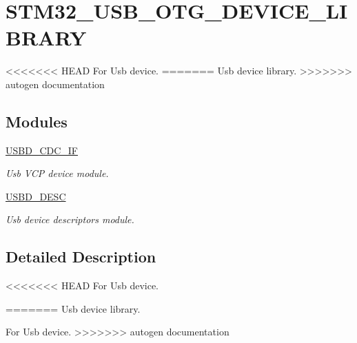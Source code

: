 \hypertarget{group___s_t_m32___u_s_b___o_t_g___d_e_v_i_c_e___l_i_b_r_a_r_y}{}\section{S\+T\+M32\+\_\+\+U\+S\+B\+\_\+\+O\+T\+G\+\_\+\+D\+E\+V\+I\+C\+E\+\_\+\+L\+I\+B\+R\+A\+RY}
\label{group___s_t_m32___u_s_b___o_t_g___d_e_v_i_c_e___l_i_b_r_a_r_y}


<<<<<<< HEAD
For Usb device.  
=======
Usb device library.  
>>>>>>> autogen documentation


\subsection*{Modules}
\begin{DoxyCompactItemize}
\item 
\hyperlink{group___u_s_b_d___c_d_c___i_f}{U\+S\+B\+D\+\_\+\+C\+D\+C\+\_\+\+IF}
\begin{DoxyCompactList}\small\item\em Usb V\+CP device module. \end{DoxyCompactList}\item 
\hyperlink{group___u_s_b_d___d_e_s_c}{U\+S\+B\+D\+\_\+\+D\+E\+SC}
\begin{DoxyCompactList}\small\item\em Usb device descriptors module. \end{DoxyCompactList}\end{DoxyCompactItemize}


\subsection{Detailed Description}
<<<<<<< HEAD
For Usb device. 

=======
Usb device library. 

For Usb device.
>>>>>>> autogen documentation
